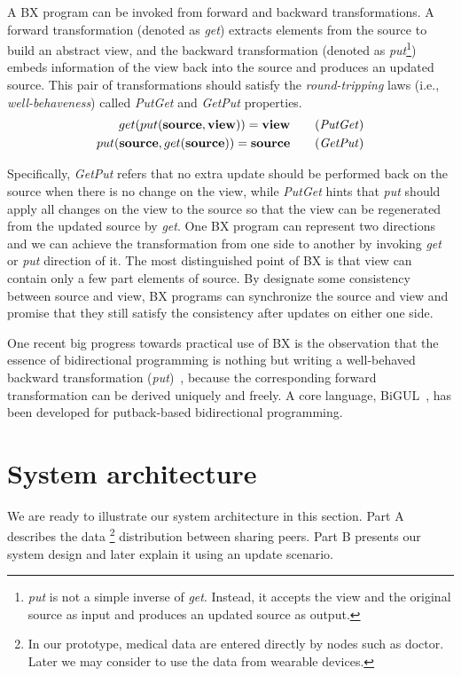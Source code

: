 \documentclass[conference]{IEEEtran}
\begin{document}
	A BX program can be invoked from forward and backward transformations. A forward transformation (denoted as \emph{get}) extracts elements from the source to build an abstract view, and the backward transformation (denoted as \emph{put}\footnote{\emph{put} is not a simple inverse of \emph{get}. Instead, it accepts the view and the original source as input and produces an updated source as output.}) embeds information of the view back into the source and produces an updated source. This pair of transformations should satisfy the {\em round-tripping} laws (i.e., {\em well-behaveness}) called \emph{PutGet} and \emph{GetPut} properties. 
	\begin{align}
	get (put(\textbf{source}, \textbf{view}))= \textbf{view} \tag {\emph{PutGet}} \\
	put (\textbf{source}, get (\textbf{source})) = \textbf{source} \tag {\emph{GetPut}} 
	\end{align}
	
	Specifically, \emph{GetPut} refers that no extra update should be performed back on the source when there is no change on the view, while \emph{PutGet} hints that \emph{put} should apply all changes on the view to the source so that the view can be regenerated from the updated source by \emph{get}. One BX program can represent two directions and we can achieve the transformation from one side to another by invoking \emph{get} or \emph{put} direction of it. The most distinguished point of BX is that view can contain only a few part elements of source. By designate some consistency between source and view, BX programs can synchronize the source and view and promise that they still satisfy the consistency after updates on either one side.
	
	One recent big progress towards practical use of BX is the observation that the essence of bidirectional programming is nothing but writing a well-behaved backward transformation (\emph{put})~\cite{hu2014validity, pacheco2014monadic, pacheco2014biflux}, because the corresponding forward transformation can be derived uniquely and freely. A core language, BiGUL~\cite{bigul}, has been developed for putback-based bidirectional programming.
    
\section{System architecture}
\label{system}
     We are ready to illustrate our system architecture in this section. Part A describes the data \footnote{In our prototype, medical data are entered directly by nodes such as doctor. Later we may consider to use the data from wearable devices.} distribution between sharing peers. Part B presents our system design and later explain it using an update scenario.
\end{document}
